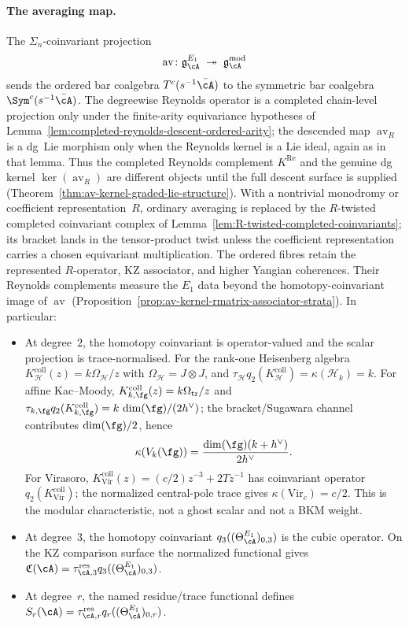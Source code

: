 \paragraph{The averaging map.}
The $\Sigma_n$-coinvariant projection
\[
\operatorname{av}\colon \mathfrak{g}^{E_1}_\cA
\;\twoheadrightarrow\;
\mathfrak{g}^{\mathrm{mod}}_\cA
\]
sends the ordered bar coalgebra $T^c(s^{-1}\bar\cA)$ to the
symmetric bar coalgebra $\Sym^c(s^{-1}\bar\cA)$.
The degreewise Reynolds operator is a completed chain-level projection
only under the finite-arity equivariance hypotheses of
Lemma~\ref{lem:completed-reynolds-descent-ordered-arity}; the descended
map \(\operatorname{av}_R\) is a dg~Lie morphism only when the Reynolds
kernel is a Lie ideal, again as in that lemma. Thus the completed
Reynolds complement \(K^{\mathrm{Re}}\) and the genuine dg kernel
\(\ker(\operatorname{av}_R)\) are different objects until the full
descent surface is supplied
\textup{(}Theorem~\ref{thm:av-kernel-graded-lie-structure}\textup{)}.
With a nontrivial monodromy or coefficient
representation~$R$, ordinary averaging is replaced by the
$R$-twisted completed coinvariant complex of
Lemma~\ref{lem:R-twisted-completed-coinvariants}; its bracket lands in
the tensor-product twist unless the coefficient representation carries a
chosen equivariant multiplication.
The ordered fibres retain the represented $R$-operator, KZ
associator, and higher Yangian coherences.  Their Reynolds complements
measure the $E_1$ data beyond the homotopy-coinvariant image of
$\operatorname{av}$
(Proposition~\ref{prop:av-kernel-rmatrix-associator-strata}). In
particular:
\begin{itemize}
\item At degree~$2$, the homotopy coinvariant is operator-valued and
 the scalar projection is trace-normalised.
 For the rank-one Heisenberg algebra
 $K_{\mathcal H}^{\mathrm{coll}}(z)=k\Omega_{\mathcal H}/z$ with
 $\Omega_{\mathcal H}=J\otimes J$, and
 $\tau_{\mathcal H}q_2(K_{\mathcal H}^{\mathrm{coll}})
 =\kappa(\mathcal H_k)=k$.
 For affine Kac--Moody,
 $K_{k,\fg}^{\mathrm{coll}}(z)=k\Omega_{\mathrm{tr}}/z$ and
 $\tau_{k,\fg}q_2(K_{k,\fg}^{\mathrm{coll}})
 =k\,\dim(\fg)/(2h^\vee)$; the bracket/Sugawara channel
 contributes $\dim(\fg)/2$, hence
 \[
  \kappa(V_k(\fg))=
  \frac{\dim(\fg)(k+h^\vee)}{2h^\vee}.
 \]
 For Virasoro,
 $K_{\mathrm{Vir}}^{\mathrm{coll}}(z)
 =(c/2)z^{-3}+2Tz^{-1}$ has coinvariant operator
 $q_2(K_{\mathrm{Vir}}^{\mathrm{coll}})$; the normalized central-pole
 trace gives $\kappa(\mathrm{Vir}_c)=c/2$. This is the modular
 characteristic, not a ghost scalar and not a BKM weight.
\item At degree~$3$, the homotopy coinvariant
 $q_3((\Theta_\cA^{E_1})_{0,3})$ is the cubic operator.  On the KZ
 comparison surface the normalized functional gives
 $\mathfrak{C}(\cA)=\tau_{\cA,3}^{\mathrm{res}}
 q_3((\Theta_\cA^{E_1})_{0,3})$.
\item At degree~$r$, the named residue/trace functional defines
 $S_r(\cA)=\tau_{\cA,r}^{\mathrm{res}}
 q_r((\Theta_\cA^{E_1})_{0,r})$.
\end{itemize}
